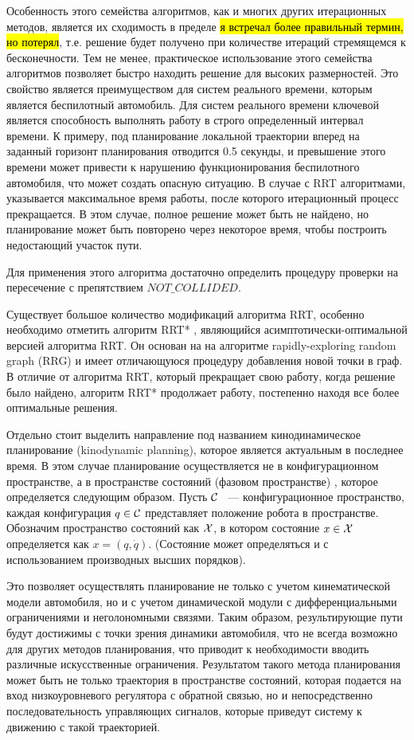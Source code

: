 Особенность этого семейства алгоритмов, как и многих других итерационных методов, является их сходимость
в пределе \hl{я встречал более правильный термин, но потерял}, т.е. решение будет получено при количестве
итераций стремящемся к бесконечности. Тем не менее, практическое использование этого семейства алгоритмов
позволяет быстро находить решение для высоких размерностей. Это свойство является преимуществом для систем
реального времени, которым является беспилотный автомобиль. Для систем реального времени ключевой является
способность выполнять работу в строго определенный интервал времени. К примеру, под планирование локальной
траектории вперед на заданный горизонт планирования отводится 0.5 секунды, и превышение этого времени может
привести к нарушению функционирования беспилотного автомобиля, что может создать опасную ситуацию.  В случае
с RRT алгоритмами, указывается максимальное время работы, после которого итерационный процесс прекращается.
В этом случае, полное решение может быть не найдено, но планирование может быть повторено через некоторое
время, чтобы построить недостающий участок пути.

Для применения этого алгоритма достаточно определить процедуру проверки на пересечение с препятствием
$NOT\_COLLIDED$.

Существует большое количество модификаций алгоритма RRT, особенно необходимо отметить алгоритм RRT*
\cite{motion_planning_rrt_star}, являющийся асимптотически-оптимальной версией алгоритма RRT. Он основан на
на алгоритме rapidly-exploring random graph (RRG) и имеет отличающуюся процедуру добавления новой точки в граф.
В отличие от алгоритма RRT, который прекращает свою работу, когда решение было найдено, алгоритм RRT* продолжает
работу, постепенно находя все более оптимальные решения.

Отдельно стоит выделить направление под названием кинодинамическое планирование (kinodynamic planning), которое
является актуальным в последнее время. В этом случае планирование осуществляется не в конфигурационном пространстве,
а в пространстве состояний (фазовом пространстве) \cite{motion_planning_kinodynamic_rrt}, которое определяется
следующим образом. Пусть $\mathcal{C}$ ~--- конфигурационное пространство, каждая конфигурация $q \in \mathcal{C}$ представляет
положение робота в пространстве. Обозначим пространство состояний как $\mathcal{X}$, в котором состояние $x \in \mathcal{X}$
определяется как $x = (q, \dot{q})$. (Состояние может определяться и с использованием производных высших порядков).

Это позволяет осуществлять планирование не только с учетом кинематической модели автомобиля, но и с учетом
динамической модули с дифференциальными ограничениями и неголономными связями.
Таким образом, результирующие пути будут достижимы с точки зрения динамики автомобиля, что
не всегда возможно для других методов планирования, что приводит к необходимости вводить различные искусственные
ограничения. Результатом такого метода планирования может быть не только траектория в пространстве
состояний, которая подается на вход низкоуровневого регулятора с обратной связью, но и непосредственно
последовательность управляющих сигналов, которые приведут систему к движению с такой траекторией.


